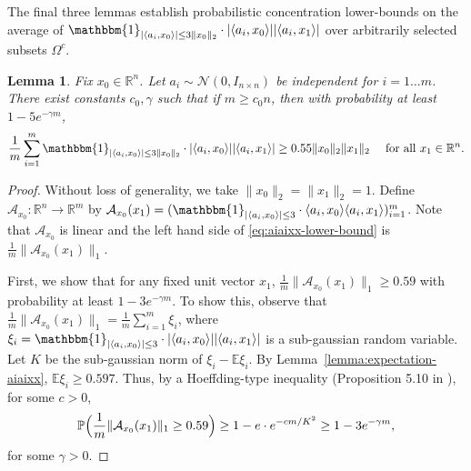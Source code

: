 \documentclass[12pt]{article}
\newcommand{\1}{\mathbbm{1}}
\newcommand{\xo}{x_0}
\newcommand{\R}{\mathbb{R}}
\newcommand{\Omegac}{\Omega^c}
\newcommand{\inddef}{\mathbbm{1}_{|\langle a_i, \xo \rangle| \leq 3}}
\newcommand{\inddefwithnorm}{\mathbbm{1}_{|\langle a_i, \xo \rangle| \leq 3 \| \xo \|_2}}
\newcommand{\aixo}{\langle a_i, \xo \rangle}
\newcommand{\aixone}{\langle a_i, x_1 \rangle}
\newcommand{\A}{\mathcal{A}}
\newcommand{\Axo}{\A_{\xo}}
\newcommand{\PP}{\mathbb{P}}
\newtheorem{lemma}[theorem]{Lemma}
\begin{document}
The final three lemmas establish probabilistic concentration lower-bounds on the average of   $\inddefwithnorm \cdot |\aixo | |\aixone |$ over arbitrarily  selected subsets $\Omegac$.

\begin{lemma}  \label{lemma:lower-bound-ind}
Fix $\xo \in \R^n$.  Let $a_i \sim \mathcal{N}(0, I_{n \times n})$ be independent for $i = 1 \ldots m$.  There exist constants $c_0, \gamma$ such that if $m \geq c_0 n$, then with probability at least $1-5 e^{-\gamma m}$,
\begin{align}
\frac{1}{m} \sum_{i=1}^m \inddefwithnorm \cdot |\aixo | |\aixone | \geq 0.55 \| x_0\|_2 \|x_1\|_2 \quad \text{ for all } x_1 \in \R^n. \label{eq:aiaixx-lower-bound}
\end{align}
\end{lemma}
\begin{proof} 
Without loss of generality, we take $\|x_0\|_2 = \|x_1\|_2 = 1$. 
Define $\Axo: \R^{n} \to \R^m$ by $\Axo(x_1) = (\inddef \cdot \aixo \aixone)_{i=1}^m$.  Note that $\Axo$ is linear and the left hand side of \eqref{eq:aiaixx-lower-bound} is $\frac{1}{m} \| \Axo (x_1) \|_1$. 
 
First, we show that for any fixed unit vector $x_1$, 
$\frac{1}{m} \| \Axo (x_1)\|_1 \geq 0.59$
with probability at least $1 - 3 e^{-\gamma m }$.  To show this, observe that $\frac{1}{m}\|\Axo(x_1)\|_1 = \frac{1}{m} \sum_{i=1}^m \xi_i$, where $\xi_i = \inddef \cdot | \langle a_i, x_0\rangle| |\langle a_i, x_1\rangle| $ is a sub-gaussian random variable.  Let $K$ be the sub-gaussian norm of $\xi_i - \mathbb{E}\xi_i$.  By Lemma~\ref{lemma:expectation-aiaixx}, $\mathbb{E} \xi_i \geq 0.597$.     Thus, by a Hoeffding-type inequality  (Proposition 5.10  in \cite{V2012}), for some $c>0$,
$$
\PP\Bigl( \frac{1}{m} \| \Axo(x_1)\|_1 \geq 0.59 \Bigr) \geq 1- e \cdot e^{-cm/K^2} \geq 1 - 3 e^{-\gamma m},
$$
for some $\gamma >0$.



\end{proof}
\end{document}
